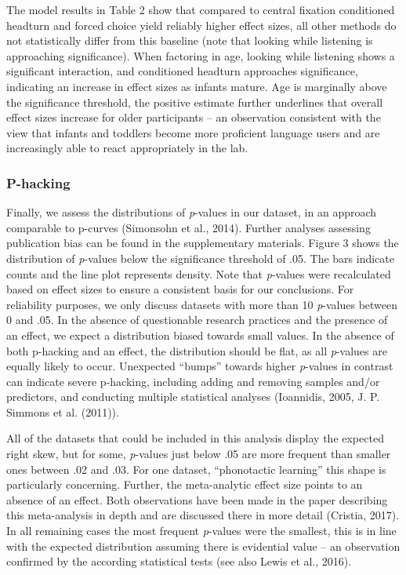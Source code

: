 \documentclass[english,floatsintext,man]{apa6}
\begin{document}
The model results in Table 2 show that compared to central fixation
conditioned headturn and forced choice yield reliably higher effect
sizes, all other methods do not statistically differ from this baseline
(note that looking while listening is approaching significance). When
factoring in age, looking while listening shows a significant
interaction, and conditioned headturn approaches significance,
indicating an increase in effect sizes as infants mature. Age is
marginally above the significance threshold, the positive estimate
further underlines that overall effect sizes increase for older
participants -- an observation consistent with the view that infants and
toddlers become more proficient language users and are increasingly able
to react appropriately in the lab.

\subsubsection{P-hacking}\label{p-hacking-1}

Finally, we assess the distributions of \emph{p}-values in our dataset,
in an approach comparable to p-curves (Simonsohn et al., 2014). Further
analyses assessing publication bias can be found in the supplementary
materials. Figure 3 shows the distribution of \emph{p}-values below the
significance threshold of .05. The bars indicate counts and the line
plot represents density. Note that \emph{p}-values were recalculated
based on effect sizes to ensure a consistent basis for our conclusions.
For reliability purposes, we only discuss datasets with more than 10
\emph{p}-values between 0 and .05. In the absence of questionable
research practices and the presence of an effect, we expect a
distribution biased towards small values. In the absence of both
p-hacking and an effect, the distribution should be flat, as all
\emph{p}-values are equally likely to occur. Unexpected \enquote{bumps}
towards higher \emph{p}-values in contrast can indicate severe
p-hacking, including adding and removing samples and/or predictors, and
conducting multiple statistical analyses (Ioannidis, 2005, J. P. Simmons
et al. (2011)).

All of the datasets that could be included in this analysis display the
expected right skew, but for some, \emph{p}-values just below .05 are
more frequent than smaller ones between .02 and .03. For one dataset,
\enquote{phonotactic learning} this shape is particularly concerning.
Further, the meta-analytic effect size points to an absence of an
effect. Both observations have been made in the paper describing this
meta-analysis in depth and are discussed there in more detail (Cristia,
2017). In all remaining cases the most frequent \emph{p}-values were the
smallest, this is in line with the expected distribution assuming there
is evidential value -- an observation confirmed by the according
statistical tests (see also Lewis et al., 2016).
\end{document}
